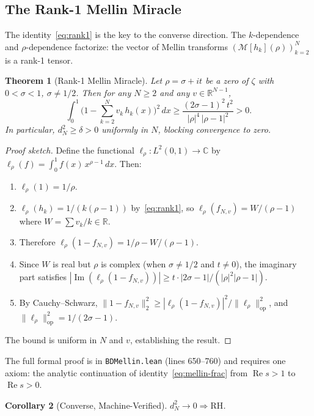 \documentclass[11pt,a4paper]{article}
\theoremstyle{plain}
\newtheorem{theorem}{Theorem}[section]
\newtheorem{corollary}[theorem]{Corollary}
\theoremstyle{definition}
\theoremstyle{remark}
\newcommand{\RH}{\mathrm{RH}}
\newcommand{\re}{\operatorname{Re}}
\newcommand{\im}{\operatorname{Im}}
\newcommand{\RR}{\mathbb{R}}
\newcommand{\CC}{\mathbb{C}}
\newcommand{\lean}[1]{\texttt{#1}}
\begin{document}
\subsection{The Rank-1 Mellin Miracle}

The identity~\eqref{eq:rank1} is the key to the converse direction.
The $k$-dependence and $\rho$-dependence factorize: the vector of
Mellin transforms $(\mathcal{M}[h_k](\rho))_{k=2}^N$ is a rank-1 tensor.

\begin{theorem}[Rank-1 Mellin Miracle]
\label{thm:rank1}
Let $\rho = \sigma + it$ be a zero of $\zeta$ with $0 < \sigma < 1$,
$\sigma \neq 1/2$. Then for any $N \geq 2$ and any
$v \in \RR^{N-1}$,
\[
  \int_0^1 \biggl(1 - \sum_{k=2}^N v_k\,h_k(x)\biggr)^2\,dx
  \geq \frac{(2\sigma - 1)^2\,t^2}{|\rho|^4\,|\rho-1|^2} > 0.
\]
In particular, $d_N^2 \geq \delta > 0$ uniformly in $N$, blocking
convergence to zero.
\end{theorem}

\begin{proof}[Proof sketch]
Define the functional $\ell_\rho : L^2(0,1) \to \CC$ by
$\ell_\rho(f) = \int_0^1 f(x)\,x^{\rho-1}\,dx$. Then:
\begin{enumerate}
  \item $\ell_\rho(1) = 1/\rho$.
  \item $\ell_\rho(h_k) = 1/(k(\rho-1))$ by~\eqref{eq:rank1}, so
    $\ell_\rho(f_{N,v}) = W/(\rho-1)$ where $W = \sum v_k/k \in \RR$.
  \item Therefore $\ell_\rho(1 - f_{N,v}) = 1/\rho - W/(\rho-1)$.
  \item Since $W$ is real but $\rho$ is complex (when $\sigma \neq 1/2$
    and $t \neq 0$), the imaginary part satisfies
    $|\im(\ell_\rho(1 - f_{N,v}))| \geq t \cdot |2\sigma - 1| /
    (|\rho|^2 |\rho-1|)$.
  \item By Cauchy--Schwarz,
    $\|1 - f_{N,v}\|_2^2 \geq |\ell_\rho(1 - f_{N,v})|^2 /
    \|\ell_\rho\|_{\mathrm{op}}^2$,
    and $\|\ell_\rho\|_{\mathrm{op}}^2 = 1/(2\sigma - 1)$.
\end{enumerate}
The bound is uniform in $N$ and $v$, establishing the result.
\end{proof}

The full formal proof is in \lean{BDMellin.lean} (lines 650--760) and
requires one axiom: the analytic continuation of
identity~\eqref{eq:mellin-frac} from $\re s > 1$ to $\re s > 0$.

\begin{corollary}[Converse, Machine-Verified]
\label{cor:converse}
$d_N^2 \to 0 \Rightarrow \RH$.
\end{corollary}
\end{document}
